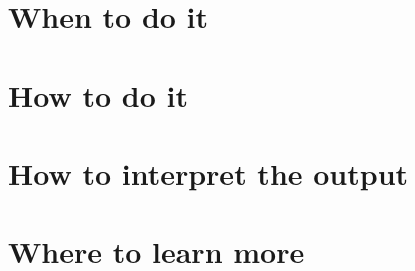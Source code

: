 \documentclass[
]{book}
\begin{document}
\hypertarget{when-to-do-it-23}{%
\section{When to do it}\label{when-to-do-it-23}}

\hypertarget{how-to-do-it-23}{%
\section{How to do it}\label{how-to-do-it-23}}

\hypertarget{how-to-interpret-the-output-23}{%
\section{How to interpret the output}\label{how-to-interpret-the-output-23}}

\hypertarget{where-to-learn-more-23}{%
\section{Where to learn more}\label{where-to-learn-more-23}}

  
\end{document}
